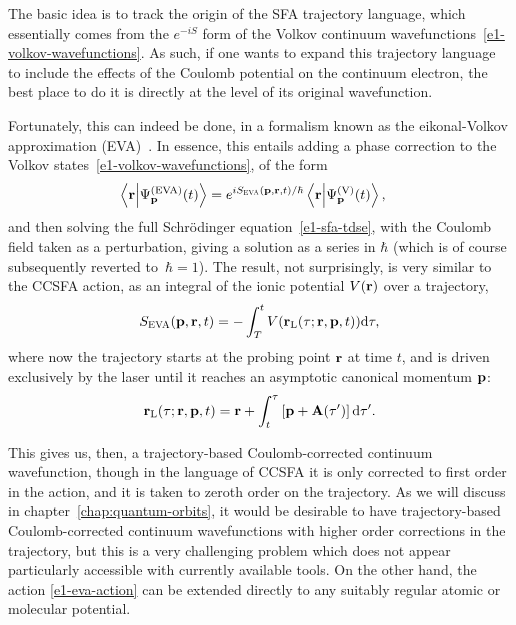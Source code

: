 The basic idea is to track the origin of the SFA trajectory language, which essentially comes from the $e^{-iS}$ form of the Volkov continuum wavefunctions~\eqref{e1-volkov-wavefunctions}. As such, if one wants to expand this trajectory language to include the effects of the Coulomb potential on the continuum electron, the best place to do it is directly at the level of its original wavefunction.

Fortunately, this can indeed be done, in a formalism known as the eikonal-Volkov approximation (EVA)~\cite{eikonalVolkov_prelim, eikonalVolkov_initial}. In essence, this entails adding a phase correction to the Volkov states~\eqref{e1-volkov-wavefunctions}, of the form 
\begin{align}
\braket{\vb{r}}{\Psi_{\vb{p}}^{\mathrm{(EVA)}}(t)}
& = 
e^{iS_\textsc{EVA}(\vb{p},\vb{r},t)/\hbar}
\braket{\vb{r}}{\Psi_{\vb{p}}^{\mathrm{(V)}}(t)}
,
\label{e1-eikonal-volkov-essential-ansatz}
\end{align}
and then solving the full Schrödinger equation~\eqref{e1-sfa-tdse}, with the Coulomb field taken as a perturbation, giving a solution as a series in $\hbar$ (which is of course subsequently reverted to~$\hbar=1$). The result, not surprisingly, is very similar to the CCSFA action, as an integral of the ionic potential $V(\vb{r})$ over a trajectory,
\begin{equation}
S_\textsc{EVA}(\vb{p},\vb{r},t) = -\int_T^t V(\vb{r}_\mathrm{L}(\tau;\vb{r},\vb{p},t))\mathrm{d}\tau
,
\label{e1-eva-action}
\end{equation}
where now the trajectory starts at the probing point $\vb{r}$ at time $t$, and is driven exclusively by the laser until it reaches an asymptotic canonical momentum $\vb{p}$:
\begin{equation}
\vb{r}_\mathrm{L}(\tau;\vb{r},\vb{p},t)
=
\vb{r}+\int_t^\tau \left[\vb{p}+\vb{A}(\tau')\right]\mathrm{d}\tau'
.
\label{e1-eva-trajectory}
\end{equation}


This gives us, then, a trajectory-based Coulomb-corrected continuum wavefunction, though in the language of CCSFA it is only corrected to first order in the action, and it is taken to zeroth order on the trajectory. As we will discuss in chapter~\ref{chap:quantum-orbits}, it would be desirable to have trajectory-based Coulomb-corrected continuum wavefunctions with higher order corrections in the trajectory, but this is a very challenging problem which does not appear particularly accessible with currently available tools. On the other hand, the action \eqref{e1-eva-action} can be extended directly to any suitably regular atomic or molecular potential.

